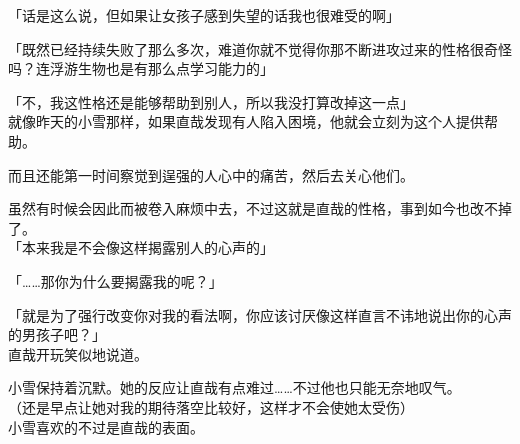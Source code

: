 「话是这么说，但如果让女孩子感到失望的话我也很难受的啊」

「既然已经持续失败了那么多次，难道你就不觉得你那不断进攻过来的性格很奇怪吗？连浮游生物也是有那么点学习能力的」

「不，我这性格还是能够帮助到别人，所以我没打算改掉这一点」\\

就像昨天的小雪那样，如果直哉发现有人陷入困境，他就会立刻为这个人提供帮助。

而且还能第一时间察觉到逞强的人心中的痛苦，然后去关心他们。

虽然有时候会因此而被卷入麻烦中去，不过这就是直哉的性格，事到如今也改不掉了。\\

「本来我是不会像这样揭露别人的心声的」

「……那你为什么要揭露我的呢？」

「就是为了强行改变你对我的看法啊，你应该讨厌像这样直言不讳地说出你的心声的男孩子吧？」\\

直哉开玩笑似地说道。

小雪保持着沉默。她的反应让直哉有点难过……不过他也只能无奈地叹气。\\

（还是早点让她对我的期待落空比较好，这样才不会使她太受伤）\\

小雪喜欢的不过是直哉的表面。

